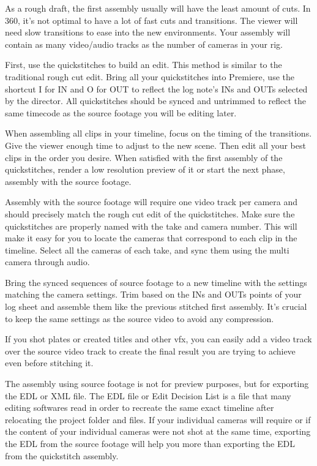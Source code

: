 \begin{fullwidth}
As a rough draft, the first assembly usually will have the least amount of cuts. In 360, it’s not optimal to have a lot of fast cuts and transitions. The viewer will need slow transitions to ease into the new environments. Your assembly will contain as many video/audio tracks as the number of cameras in your rig. 

First, use the quickstitches to build an edit. This method is similar to the traditional rough cut edit. Bring all your quickstitches into Premiere, use the shortcut I for IN and O for OUT to reflect the log note’s INs and OUTs selected by the director. All quickstitches should be synced and untrimmed to reflect the same timecode as the source footage you will be editing later.

When assembling all clips in your timeline, focus on the timing of the transitions. Give the viewer enough time to adjust to the new scene. Then edit all your best clips in the order you desire. When satisfied with the first assembly of the quickstitches, render a low resolution preview of it or start the next phase, assembly with the source footage.


Assembly with the source footage will require one video track per camera and should precisely match the rough cut edit of the quickstitches. Make sure the quickstitches are properly named with the take and camera number. This will make it easy for you to locate the cameras that correspond to each clip in the timeline. Select all the cameras of each take, and sync them using the multi camera \textbf{} through audio.

Bring the synced sequences of source footage to a new timeline with the settings matching the camera settings. Trim based on the INs and OUTs points of your log sheet and assemble them like the previous stitched first assembly. It’s crucial to keep the same settings as the source video to avoid any compression. 

If you shot plates or created titles and other vfx, you can easily add a video track over the source video track to create the final result you are trying to achieve even before stitching it.


The assembly using source footage is not for preview purposes, but for exporting the EDL or XML file. The EDL file or Edit Decision List is a file that many editing softwares read in order to recreate the same exact timeline after relocating the project folder and files. If your individual cameras will require \textbf{} or if the content of your individual cameras were not shot at the same time, exporting the EDL from the source footage will help you more than exporting the EDL from the quickstitch assembly.


\end{fullwidth}
